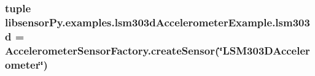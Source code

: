 \subsubsection[{lsm303d}]{\setlength{\rightskip}{0pt plus 5cm}tuple libsensor\+Py.\+examples.\+lsm303d\+Accelerometer\+Example.\+lsm303d = {\bf Accelerometer\+Sensor\+Factory.\+create\+Sensor}(\char`\"{}L\+S\+M303\+D\+Accelerometer\char`\"{})}\label{namespacelibsensorPy_1_1examples_1_1lsm303dAccelerometerExample_aa5ac31375b1cbeb0477d86f02278eba6}
